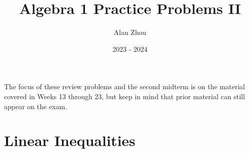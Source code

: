 \documentclass{article}
\title{Algebra 1 Practice Problems II}
\author{Alan Zhou}
\date{2023 - 2024}
\begin{document}
\maketitle

The focus of these review problems and the second midterm is on the material covered in Weeks 13 through 23, but keep in mind that prior material can still appear on the exam.

\tableofcontents





\section{Linear Inequalities}
\end{document}
